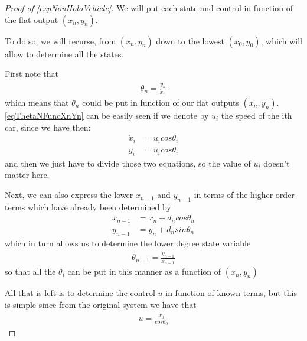 \documentclass[12pt]{article}
\begin{document}
\begin{proof}[ Proof of \ref{expNonHoloVehicle}]
  We will put each state and control in function of the flat output $(x_n,y_n)$.
  
  To do so, we will recurse, from $(x_n,y_n)$ down to the lowest $(x_0,y_0)$, which
  will allow to determine all the states.

  First note that
  \begin{equation}\begin{aligned} \label{eqThetaNFuncXnYn}
    \theta_{n} = \frac{\dot{y}_n}{\dot{x}_n}
  \end{aligned}\end{equation}
  which means that $\theta_n$ could be put in function of our flat outputs $(x_n,y_n)$. 
  \eqref{eqThetaNFuncXnYn} can be easily seen if we denote by $u_i$ the speed of the
  ith car, since we have then:
  \begin{equation}\begin{aligned}
    \dot{x}_i &= u_i cos \theta_i \\
    \dot{y}_i &= u_i cos \theta_i
  \end{aligned}\end{equation}
  and then we just have to divide those two equations, so the value of $u_i$ doesn't matter here.
  
  Next, we can also express the lower $x_{n-1}$ and $y_{n-1}$ in terms of the higher
  order terms which have already been determined by
  \begin{equation}\begin{aligned}
    x_{n-1} &= x_n + d_n cos \theta_n \\
    y_{n-1} &= y_n + d_n sin \theta_n
  \end{aligned}\end{equation}
  which in turn allows us to determine the lower degree state variable
  \begin{equation}\begin{aligned}
    \theta_{n-1} = \frac{\dot{y}_{n-1}}{\dot{x}_{n-1}}
  \end{aligned}\end{equation}
  so that all the $\theta_i$ can be put in this manner as a function of $(x_n,y_n)$
  
  All that is left is to determine the control $u$ in function of known terms, but
  this is simple since from the original system we have that
  \begin{equation}\begin{aligned}
    u = \frac{\dot{x}_0}{cos \theta_0}
  \end{aligned}\end{equation}
  
\end{proof}
\end{document}
